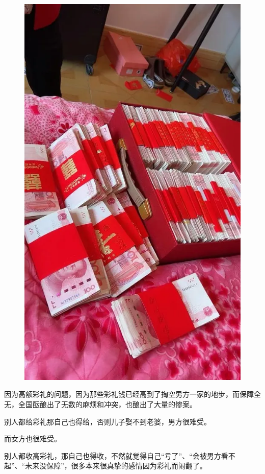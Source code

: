 \documentclass[UTF8,11pt,oneside]{ctexart}
\begin{document}
\begin{figure}[H]
    \centering
    \includegraphics[width=13cm]{2025-04-17-008.png}
\end{figure}

因为高额彩礼的问题，因为那些彩礼钱已经高到了掏空男方一家的地步，而保障全无，全国酝酿出了无数的麻烦和冲突，也酿出了大量的惨案。

别人都给彩礼那自己也得给，否则儿子娶不到老婆，男方很难受。

而女方也很难受。

别人都收高彩礼，那自己也得收，不然就觉得自己“亏了”、“会被男方看不起”、“未来没保障”，很多本来很真挚的感情因为彩礼而闹翻了。
\end{document}
